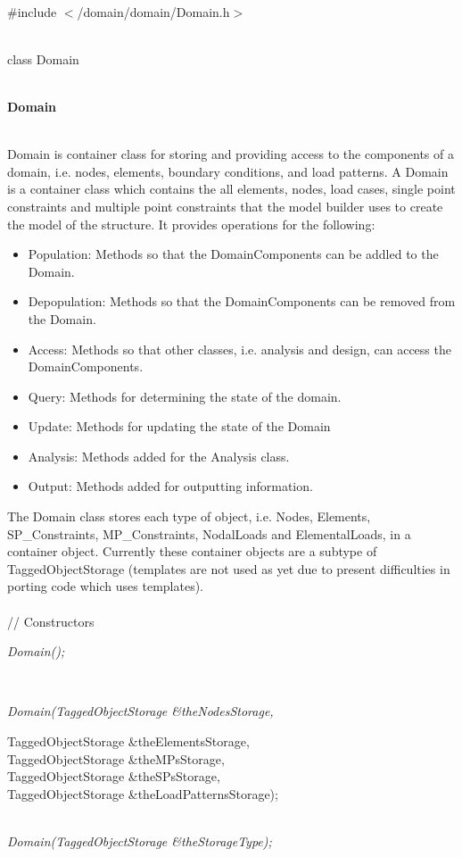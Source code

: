 
   \\
\#include $<$/domain/domain/Domain.h$>$  


  \\
class Domain  


 \\
 {\bf Domain} 


  \\
\indent Domain is container class for storing and providing access to
the components of a domain, i.e. nodes, elements, boundary conditions,
and load patterns. 
A Domain is a container class which contains the  all elements,
nodes, load cases, single point constraints and multiple point
constraints that the model builder uses to create the model of the
structure. It provides operations for the following: 
\begin{itemize}
\item Population: Methods so that the DomainComponents can be addled
to the Domain. 
\item Depopulation: Methods so that the DomainComponents can be removed
from the Domain.
\item Access: Methods so that other classes, i.e. analysis and design,
can access the DomainComponents.
\item Query: Methods for determining the state of the domain.
\item Update: Methods for updating the state of the Domain
\item Analysis: Methods added for the Analysis class.
\item Output: Methods added for outputting information.
\end{itemize}
The Domain class stores each type of object, i.e. Nodes, Elements,
SP\_Constraints, MP\_Constraints, NodalLoads and ElementalLoads, in a
container object. Currently these container objects are a subtype of
TaggedObjectStorage (templates are not used as yet due to present
difficulties in porting code which uses templates). \\

  \\
// Constructors  

{\em Domain();}  

  \\
{\em Domain(TaggedObjectStorage \&theNodesStorage, 

\indent\indent\indent           TaggedObjectStorage \&theElementsStorage, \\
\indent\indent\indent           TaggedObjectStorage \&theMPsStorage,\\
\indent\indent\indent           TaggedObjectStorage \&theSPsStorage, \\
\indent\indent\indent           TaggedObjectStorage \&theLoadPatternsStorage);}\\ 
{\em Domain(TaggedObjectStorage \&theStorageType);}\\ 

